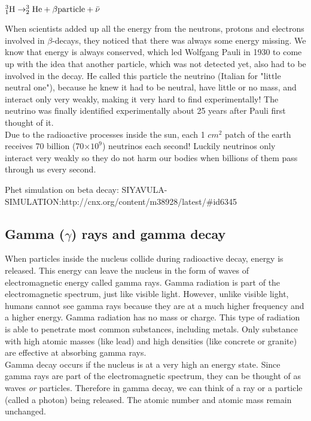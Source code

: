 \begin{center}
$\rm{^{3}_{1}H \rightarrow ^{3}_{2}He + \beta particle + \bar{\nu}}$
\end{center}

\begin{IFact}{
When scientists added up all the energy from the neutrons, protons and electrons involved in $\beta$-decays, they noticed that there was always some energy missing. We know that energy is always conserved, which led Wolfgang Pauli in 1930 to come up with the idea that another particle, which was not detected yet, also had to be involved in the decay. He called this particle the neutrino (Italian for "little neutral one"), because he knew it had to be neutral, have little or no mass, and interact only very weakly, making it very hard to find experimentally! The neutrino was finally identified experimentally about 25 years after Pauli first thought of it.\\

Due to the radioactive processes inside the sun, each 1 $cm^{2}$ patch of the earth receives 70 billion (70$\times 10^{9}$) neutrinos each second! Luckily neutrinos only interact very weakly so they do not harm our bodies when billions of them pass through us every second.
}
\end{IFact}
Phet simulation on beta decay: SIYAVULA-SIMULATION:http://cnx.org/content/m38928/latest/#id6345
\subsection{Gamma ($\gamma$) rays and gamma decay}

When particles inside the nucleus collide during radioactive decay, energy is released. This energy can leave the nucleus in the form of waves of electromagnetic energy called gamma rays. Gamma radiation is part of the electromagnetic spectrum, just like visible light. However, unlike visible light, humans cannot see gamma rays because they are at a much higher frequency and a higher energy. Gamma radiation has no mass or charge. This type of radiation is able to penetrate most common substances, including metals. Only substance with high atomic masses (like lead) and high densities (like concrete or granite) are effective at absorbing gamma rays.\\

Gamma decay occurs if the nucleus is at a very high an energy state. Since gamma rays are part of the electromagnetic spectrum, they can be thought of as waves \emph{or} particles. Therefore in gamma decay, we can think of a ray or a particle (called a photon) being released. The atomic number and atomic mass remain unchanged.


